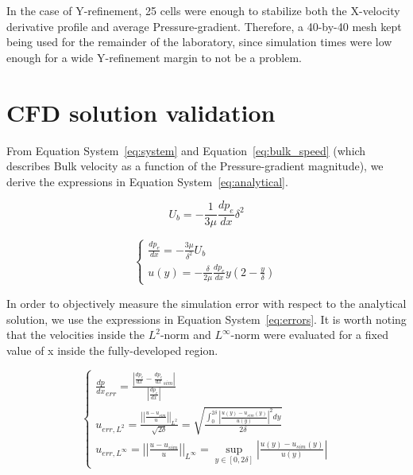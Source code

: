\documentclass[12pt]{article}
\begin{document}
        In the case of Y-refinement, 25 cells were enough to stabilize both the X-velocity derivative profile and average Pressure-gradient. Therefore, a 40-by-40 mesh kept being used for the remainder of the laboratory, since simulation times were low enough for a wide Y-refinement margin to not be a problem.

\section{CFD solution validation} \label{sec:CFD_validation}

        From Equation System~\ref{eq:system} and Equation~\ref{eq:bulk_speed} (which describes Bulk velocity as a function of the Pressure-gradient magnitude), we derive the expressions in Equation System~\ref{eq:analytical}.

        \begin{equation} \label{eq:bulk_speed}
                U_b = - \frac{1}{3 \mu} \frac{dp_e}{dx} \delta ^ 2 
        \end{equation}

        \begin{equation} \label{eq:analytical}
                \begin{cases}
                        \frac{dp_e}{dx} = - \frac{3 \mu}{\delta ^ 2} U_b \\
                        u(y) = - \frac{\delta}{2 \mu} \frac{dp_e}{dx} y (2 - \frac{y}{\delta})
                \end{cases}
        \end{equation}

        In order to objectively measure the simulation error with respect to the analytical solution, we use the expressions in Equation System~\ref{eq:errors}. It is worth noting that the velocities inside the $ L^2 $-norm and $ L^{\infty} $-norm were evaluated for a fixed value of x inside the fully-developed region.

        \begin{equation} \label{eq:errors}
                \begin{cases}
                        \frac{dp}{dx}_{err} = \frac{\left| \frac{dp_e}{dx} - \frac{dp_e}{dx}_{sim} \right|}{\left| \frac{dp_e}{dx} \right|} \\
                        u_{err, L^2} = \frac{\left| \left| \frac{u - u_{sim}}{u} \right| \right|_{L ^ 2}}{\sqrt{2 \delta}} = \sqrt{\frac{\int_{0}^{2 \delta} \left| \frac{u(y) - u_{sim}(y)}{u(y)} \right|^2 dy}{2 \delta}} \\
                        u_{err, L^{\infty}} = \left| \left| \frac{u - u_{sim}}{u} \right| \right|_{L ^ \infty} = \sup_{y \in [0, 2 \delta]} \left| \frac{u(y) - u_{sim}(y)}{u(y)} \right|
                \end{cases}
        \end{equation}
\end{document}
